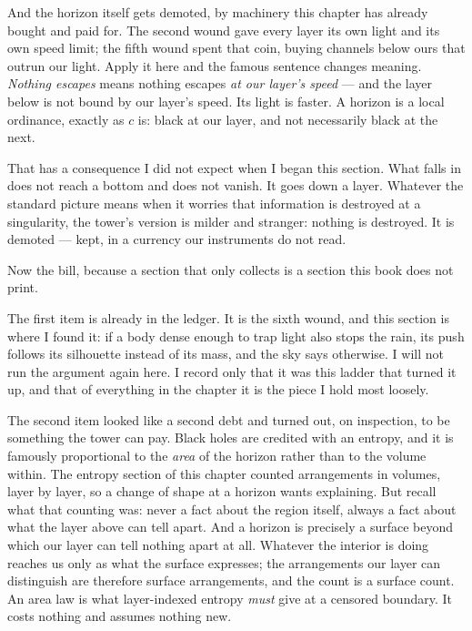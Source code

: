 And the horizon itself gets demoted, by machinery this chapter has already bought and paid for. The second wound gave every layer its own light and its own speed limit; the fifth wound spent that coin, buying channels below ours that outrun our light. Apply it here and the famous sentence changes meaning. \emph{Nothing escapes} means nothing escapes \emph{at our layer's speed} --- and the layer below is not bound by our layer's speed. Its light is faster. A horizon is a local ordinance, exactly as $c$ is: black at our layer, and not necessarily black at the next.

That has a consequence I did not expect when I began this section. What falls in does not reach a bottom and does not vanish. It goes down a layer. Whatever the standard picture means when it worries that information is destroyed at a singularity, the tower's version is milder and stranger: nothing is destroyed. It is demoted --- kept, in a currency our instruments do not read.

Now the bill, because a section that only collects is a section this book does not print.

The first item is already in the ledger. It is the sixth wound, and this section is where I found it: if a body dense enough to trap light also stops the rain, its push follows its silhouette instead of its mass, and the sky says otherwise. I will not run the argument again here. I record only that it was this ladder that turned it up, and that of everything in the chapter it is the piece I hold most loosely.

The second item looked like a second debt and turned out, on inspection, to be something the tower can pay. Black holes are credited with an entropy, and it is famously proportional to the \emph{area} of the horizon rather than to the volume within. The entropy section of this chapter counted arrangements in volumes, layer by layer, so a change of shape at a horizon wants explaining. But recall what that counting was: never a fact about the region itself, always a fact about what the layer above can tell apart. And a horizon is precisely a surface beyond which our layer can tell nothing apart at all. Whatever the interior is doing reaches us only as what the surface expresses; the arrangements our layer can distinguish are therefore surface arrangements, and the count is a surface count. An area law is what layer-indexed entropy \emph{must} give at a censored boundary. It costs nothing and assumes nothing new.

